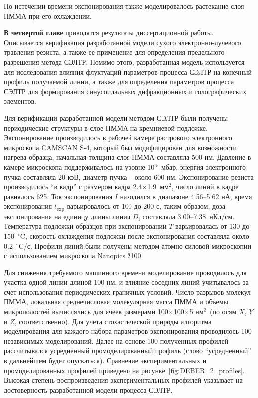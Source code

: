 По истечении времени экспонирования также моделировалось растекание слоя ПММА при его охлаждении.

\underline{\textbf{В четвертой главе}} приводятся результаты  диссертационной работы.
Описывается верификация разработанной модели сухого электронно-лучевого травления резиста, а также ее применение для определения предельного разрешения метода СЭЛТР.
Помимо этого, разработанная модель используется для исследования влияния флуктуаций параметров процесса СЭЛТР на конечный профиль получаемой линии, а также для определения параметров процесса СЭЛТР для формирования синусоидальных дифракционных и голографических элементов.

Для верификации разработанной модели методом СЭЛТР были получены периодические структуры в слое ПММА на кремниевой подложке.
Экспонирование производилось в рабочей камере растрового электронного микроскопа CAMSCAN S-4, который был модифицирован для возможности нагрева образца, начальная толщина слоя ПММА составляла 500 нм.
Давление в камере микроскопа поддерживалось на уровне 10$^{\text{-5}}$ мбар, энергия электронного пучка составляла 20 кэВ, диаметр пучка -- около 600 нм.
Экспонирование резиста производилось ``в кадр'' с размером кадра 2.4$\times$1.9~мм$^\text{2}$, число линий в кадре равнялось 625.
Ток экспонирования $I$ находился в диапазоне 4.56--5.62 нА, время экспонирования $t_\mathrm{exp}$ варьировалось от 100 до 200 с, таким образом, доза экспонирования на единицу длины линии $D_\mathrm{l}$ составляла 3.00--7.38~нКл/см.
Температура подложки образцов при экспонировании $T$ варьировалась от 130 до 150~$^\circ$C, скорость охлаждения подложки после экспонирования составляла около 0.2~$^\circ$C/с.
Профили линий были получены методом атомно-силовой микроскопии с использованием микроскопа Nanopics 2100.

Для снижения требуемого машинного времени моделирование проводилось для участка одной линии длиной 100 нм, и влияние соседних линий учитывалось за счет использования периодических граничных условий.
Число разрывов молекул ПММА, локальная среднечисловая молекулярная масса ПММА и объемы микрополостей вычислялись для ячеек размерами 100$\times$100$\times$5 нм$^\text{3}$ (по осям $X$, $Y$ и $Z$, соответственно).
Для учета стохастической природы алгоритма моделирования для каждого набора параметров экспонирования проводилось 100 независимых моделирований.
Далее на основе 100 полученных профилей рассчитывался усредненный промоделированный профиль (слово ``усредненный'' в дальнейшем будет опускаться).
Сравнение экспериментальных и промоделированных профилей приведено на рисунке~\ref{fig:DEBER_2_profiles}.
Высокая степень воспроизведения экспериментальных профилей указывает на достоверность разработанной модели процесса СЭЛТР.

